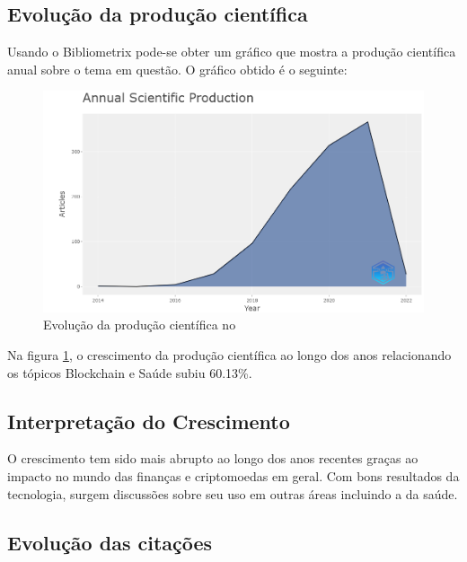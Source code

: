 \subsection{Evolução da produção científica}

Usando o Bibliometrix pode-se obter um gráfico que mostra a produção científica anual sobre o tema em questão. O gráfico obtido é o seguinte:


\begin{figure}[H]
    \centering
    \includegraphics[width=1\textwidth]{experiments/brunoedcf/AnaliseBibliometrica/BlockchainInHealth/Figures/AnualCientProd.png}
    \caption{Evolução da produção científica no \dataset}
    \label{fig:brunoedcf/AnualCientProd}
\end{figure}

Na figura \ref{fig:brunoedcf/AnualCientProd}, o crescimento da produção científica ao longo dos anos relacionando os tópicos Blockchain e Saúde subiu 60.13\%.

\subsection{Interpretação do Crescimento}

O crescimento tem sido mais abrupto ao longo dos anos recentes graças ao impacto no mundo das finanças e criptomoedas em geral. Com bons resultados da tecnologia, surgem discussões sobre seu uso em outras áreas incluindo a da saúde.

\subsection{Evolução das citações}

